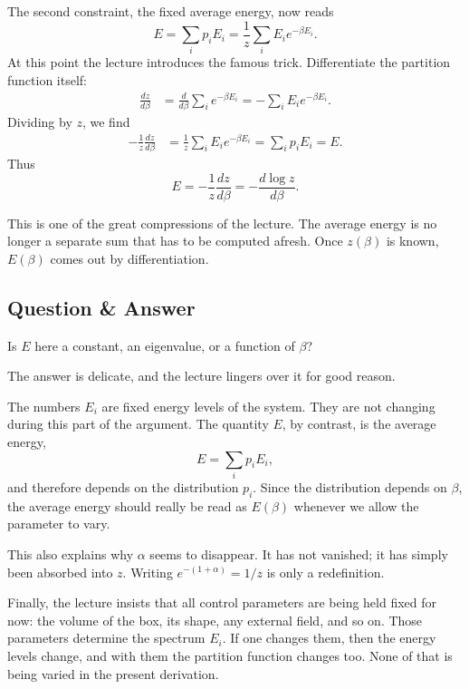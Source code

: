 The second constraint, the fixed average energy, now reads
\begin{equation}
E=\sum_i p_i E_i=\frac{1}{z}\sum_i E_i e^{-\beta E_i}.
\end{equation}
At this point the lecture introduces the famous trick. Differentiate the partition function itself:
\begin{align}
\frac{dz}{d\beta}
&=
\frac{d}{d\beta}\sum_i e^{-\beta E_i}
=
-\sum_i E_i e^{-\beta E_i}.
\end{align}
Dividing by \(z\), we find
\begin{align}
-\frac{1}{z}\frac{dz}{d\beta}
&=
\frac{1}{z}\sum_i E_i e^{-\beta E_i}
=
\sum_i p_i E_i
=
E.
\end{align}
Thus
\begin{equation}
E=-\frac{1}{z}\frac{dz}{d\beta}
=-\frac{d\log z}{d\beta}.
\end{equation}

This is one of the great compressions of the lecture. The average energy is no longer a separate sum that has to be computed afresh. Once \(z(\beta)\) is known, \(E(\beta)\) comes out by differentiation.

\subsection{Question \& Answer}

Is \(E\) here a constant, an eigenvalue, or a function of \(\beta\)?

The answer is delicate, and the lecture lingers over it for good reason.

The numbers \(E_i\) are fixed energy levels of the system. They are not changing during this part of the argument. The quantity \(E\), by contrast, is the average energy,
\begin{equation}
E=\sum_i p_i E_i,
\end{equation}
and therefore depends on the distribution \(p_i\). Since the distribution depends on \(\beta\), the average energy should really be read as \(E(\beta)\) whenever we allow the parameter to vary.

This also explains why \(\alpha\) seems to disappear. It has not vanished; it has simply been absorbed into \(z\). Writing \(e^{-(1+\alpha)}=1/z\) is only a redefinition.

Finally, the lecture insists that all control parameters are being held fixed for now: the volume of the box, its shape, any external field, and so on. Those parameters determine the spectrum \(E_i\). If one changes them, then the energy levels change, and with them the partition function changes too. None of that is being varied in the present derivation.

